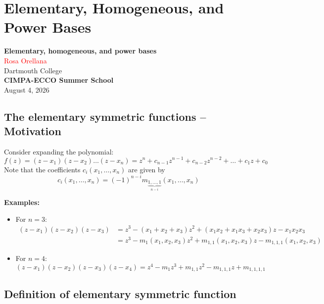 \documentclass[12pt]{memoir}
\begin{document}
\chapter{Elementary, Homogeneous, and Power Bases}

\begin{center}
    {\Huge \textbf{Elementary, homogeneous, and power bases}}\\[1.5em]
    {\Large \textcolor{red}{Rosa Orellana}}\\[0.5em]
    {\large \textcolor{verdeUCR}{Dartmouth College}}\\[0.5em]
    {\large \textbf{CIMPA-ECCO Summer School}}\\[0.5em]
    {\large August 4, 2026}
\end{center}

\newpage

\section{The elementary symmetric functions -- Motivation}

Consider expanding the polynomial:
\[
f(z) = (z - x_1)(z - x_2) \dots (z - x_n) = z^n + c_{n-1} z^{n-1} + c_{n-2} z^{n-2} + \dots + c_1 z + c_0
\]
Note that the coefficients $c_i(x_1, \dots, x_n)$ are given by
\[
c_i(x_1, \dots, x_n) = (-1)^{n-i} m_{\underbrace{1, \dots, 1}_{n-i}}(x_1, \dots, x_n)
\]

\textcolor{verdeUCR}{\textbf{Examples:}}
\begin{itemize}[label=$\diamond$]
    \item For $n = 3$:
    \[
    \begin{aligned}
    (z - x_1)(z - x_2)(z - x_3) &= z^3 - (x_1 + x_2 + x_3)z^2 + (x_1 x_2 + x_1 x_3 + x_2 x_3)z - x_1 x_2 x_3\\
    &= z^3 - m_1(x_1, x_2, x_3) z^2 + m_{1,1}(x_1, x_2, x_3) z - m_{1,1,1}(x_1, x_2, x_3)
    \end{aligned}
    \]
    \item For $n = 4$:
    \[
    (z - x_1)(z - x_2)(z - x_3)(z - x_4) = z^4 - m_1 z^3 + m_{1,1} z^2 - m_{1,1,1} z + m_{1,1,1,1}
    \]
\end{itemize}

\newpage

\section{Definition of elementary symmetric function}
\end{document}
